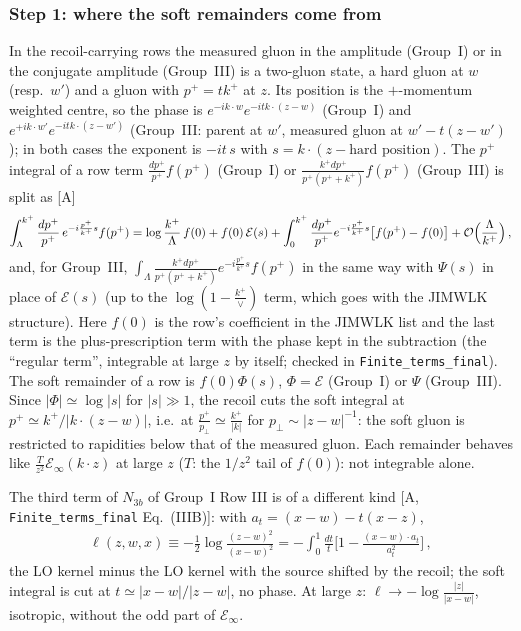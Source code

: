 \documentclass[10pt]{article}
\begin{document}
\subsubsection{Step 1: where the soft remainders come from}
\noindent In the recoil-carrying rows the measured gluon in the amplitude (Group~I) or in the conjugate amplitude (Group~III) is a two-gluon state, a hard gluon at $w$ (resp.\ $w'$) and a gluon with $p^{+}=tk^{+}$ at $z$. Its position is the $+$-momentum weighted centre, so the phase is $e^{-ik\cdot w}e^{-itk\cdot(z-w)}$ (Group~I) and $e^{+ik\cdot w'}e^{-itk\cdot(z-w')}$ (Group~III: parent at $w'$, measured gluon at $w'-t(z-w')$); in both cases the exponent is $-it\,s$ with $s=k\cdot(z-\text{hard position})$. The $p^{+}$ integral of a row term $\frac{dp^{+}}{p^{+}}f(p^{+})$ (Group~I) or $\frac{k^{+}dp^{+}}{p^{+}(p^{+}+k^{+})}f(p^{+})$ (Group~III) is split as [A]
\begin{align}
\int_{\Lambda}^{k^{+}}\frac{dp^{+}}{p^{+}}\,e^{-i\frac{p^{+}}{k^{+}}s}f(p^{+})=\log\frac{k^{+}}{\Lambda}\,f(0)+f(0)\,\mathcal{E}(s)+\int_{0}^{k^{+}}\frac{dp^{+}}{p^{+}}e^{-i\frac{p^{+}}{k^{+}}s}\big[f(p^{+})-f(0)\big]+{\cal O}\Big(\frac{\Lambda}{k^{+}}\Big)\,,\label{sf:split}
\end{align}
and, for Group~III, $\int_{\Lambda}\frac{k^{+}dp^{+}}{p^{+}(p^{+}+k^{+})}e^{-i\frac{p^{+}}{k^{+}}s}f(p^{+})$ in the same way with $\Psi(s)$ in place of $\mathcal{E}(s)$ (up to the $\log(1-\frac{k^{+}}{\vee})$ term, which goes with the JIMWLK structure). Here $f(0)$ is the row's coefficient in the JIMWLK list and the last term is the plus-prescription term with the phase kept in the subtraction (the ``regular term'', integrable at large $z$ by itself; checked in \texttt{Finite\_terms\_final}). The soft remainder of a row is $f(0)\Phi(s)$, $\Phi=\mathcal{E}$ (Group~I) or $\Psi$ (Group~III). Since $|\Phi|\simeq\log|s|$ for $|s|\gg1$, the recoil cuts the soft integral at $p^{+}\simeq k^{+}/|k\cdot(z-w)|$, i.e.\ at $\frac{p^{+}}{p_{\perp}}\simeq\frac{k^{+}}{|k|}$ for $p_{\perp}\sim|z-w|^{-1}$: the soft gluon is restricted to rapidities below that of the measured gluon. Each remainder behaves like $\frac{T}{z^{2}}\mathcal{E}_{\infty}(k\cdot z)$ at large $z$ ($T$: the $1/z^{2}$ tail of $f(0)$): not integrable alone.

The third term of $N_{3b}$ of Group~I Row III is of a different kind [A, \texttt{Finite\_terms\_final} Eq.~(IIIB)]: with $a_{t}=(x-w)-t(x-z)$,
\begin{align}
\ell(z,w,x)\equiv-\frac12\log\frac{(z-w)^{2}}{(x-w)^{2}}=-\int_{0}^{1}\frac{dt}{t}\Big[1-\frac{(x-w)\cdot a_{t}}{a_{t}^{2}}\Big]\,,\label{sf:ell}
\end{align}
the LO kernel minus the LO kernel with the source shifted by the recoil; the soft integral is cut at $t\simeq|x-w|/|z-w|$, no phase. At large $z$: $\ell\to-\log\frac{|z|}{|x-w|}$, isotropic, without the odd part of $\mathcal{E}_{\infty}$.
\end{document}
